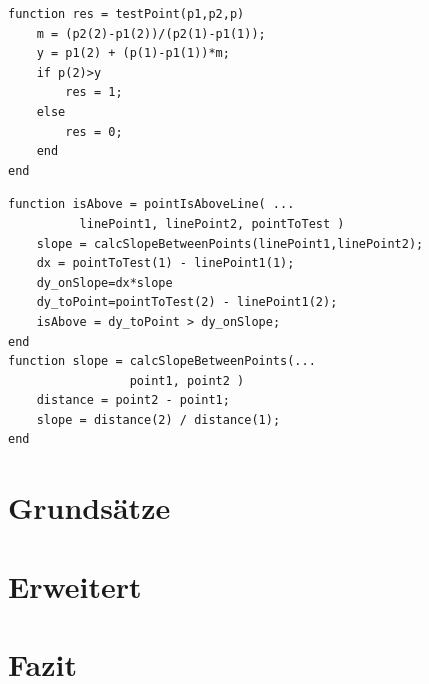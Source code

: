 \documentclass[handout]{beamer}
\begin{document}
\begin{frame}[fragile]
\begin{minipage}[t]{0.49\linewidth}
    \begin{lstlisting}[basicstyle=\tiny]
function res = testPoint(p1,p2,p)
    m = (p2(2)-p1(2))/(p2(1)-p1(1));
    y = p1(2) + (p(1)-p1(1))*m;
    if p(2)>y
        res = 1;
    else
        res = 0;
    end
end
\end{lstlisting}
\end{minipage}
\begin{minipage}[t]{0.49\linewidth}
    \begin{lstlisting}[basicstyle=\tiny]
function isAbove = pointIsAboveLine( ...
          linePoint1, linePoint2, pointToTest )
    slope = calcSlopeBetweenPoints(linePoint1,linePoint2);
    dx = pointToTest(1) - linePoint1(1);
    dy_onSlope=dx*slope
    dy_toPoint=pointToTest(2) - linePoint1(2);
    isAbove = dy_toPoint > dy_onSlope;
end
function slope = calcSlopeBetweenPoints(...
                 point1, point2 )
    distance = point2 - point1;
    slope = distance(2) / distance(1);
end
\end{lstlisting}
        
\end{minipage}
\end{frame}
\begin{frame}
\pause
{}
\end{frame}
\section{Grundsätze}

\section{Erweitert}
\section{Fazit}
\end{document}
